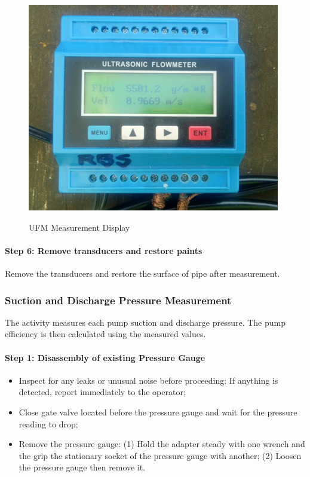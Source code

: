 \begin{figure}[!htb]
	\includegraphics[scale=1.3]{figures/ch02_flowmeasurement07} \\
	\caption{UFM Measurement Display}
	\label{ch02_flowmeasurement07} 
\end{figure}

\paragraph{Step 6: Remove transducers and restore paints}
Remove the transducers and restore the surface of pipe after measurement.

\subsubsection{Suction and Discharge Pressure Measurement}
The activity measures each pump suction and discharge pressure. The pump efficiency is then calculated using the measured values.

\paragraph{Step 1: Disassembly of existing Pressure Gauge}
\begin{itemize}
\item Inspect for any leaks or unusual noise before proceeding: If anything is detected, report immediately to the operator;
\item 	Close gate valve located before the pressure gauge and wait for the pressure reading to drop;
\item 	Remove the pressure gauge: (1) Hold the adapter steady with one wrench and the grip the stationary socket of the pressure gauge with another; (2) Loosen the pressure gauge then remove it.
\end{itemize}

